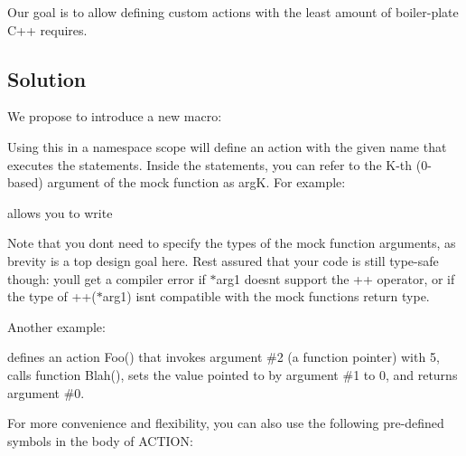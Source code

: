 Our goal is to allow defining custom actions with the least amount of boiler-\/plate C++ requires.

\subsection*{Solution}

We propose to introduce a new macro\+: 
\begin{DoxyCode}{0}
\end{DoxyCode}


Using this in a namespace scope will define an action with the given name that executes the statements. Inside the statements, you can refer to the K-\/th (0-\/based) argument of the mock function as {\ttfamily argK}. For example\+: 
\begin{DoxyCode}{0}
\end{DoxyCode}
 allows you to write 
\begin{DoxyCode}{0}
\end{DoxyCode}


Note that you don\textquotesingle{}t need to specify the types of the mock function arguments, as brevity is a top design goal here. Rest assured that your code is still type-\/safe though\+: you\textquotesingle{}ll get a compiler error if {\ttfamily $\ast$arg1} doesn\textquotesingle{}t support the {\ttfamily ++} operator, or if the type of {\ttfamily ++($\ast$arg1)} isn\textquotesingle{}t compatible with the mock function\textquotesingle{}s return type.

Another example\+: 
\begin{DoxyCode}{0}
\DoxyCodeLine{\}}
\end{DoxyCode}
 defines an action {\ttfamily Foo()} that invokes argument \#2 (a function pointer) with 5, calls function {\ttfamily Blah()}, sets the value pointed to by argument \#1 to 0, and returns argument \#0.

For more convenience and flexibility, you can also use the following pre-\/defined symbols in the body of {\ttfamily A\+C\+T\+I\+ON}\+:

